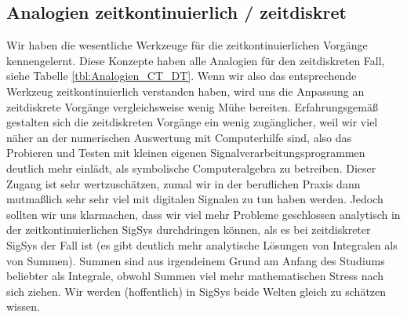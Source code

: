 \subsection*{Analogien zeitkontinuierlich / zeitdiskret}
%
Wir haben die wesentliche Werkzeuge für die zeitkontinuierlichen Vorgänge
kennengelernt.  Diese Konzepte haben alle Analogien für den zeitdiskreten Fall,
siehe Tabelle \ref{tbl:Analogien_CT_DT}.
%
Wenn wir also das entsprechende Werkzeug zeitkontinuierlich verstanden haben,
wird uns die Anpassung an zeitdiskrete Vorgänge vergleichsweise wenig Mühe
bereiten. Erfahrungsgemäß gestalten sich die zeitdiskreten Vorgänge ein wenig
zugänglicher, weil wir viel näher an der numerischen Auswertung mit Computerhilfe
sind, also das Probieren und Testen mit kleinen eigenen Signalverarbeitungsprogrammen
deutlich mehr einlädt, als symbolische Computeralgebra zu betreiben. Dieser
Zugang ist sehr wertzuschätzen, zumal wir in der beruflichen Praxis dann mutmaßlich
sehr sehr viel mit digitalen Signalen zu tun haben werden. Jedoch
sollten wir uns klarmachen, dass wir viel mehr Probleme geschlossen analytisch
in der zeitkontinuierlichen SigSys durchdringen können, als es bei zeitdiskreter
SigSys der Fall ist (es gibt deutlich mehr analytische Lösungen von Integralen als von
Summen). Summen sind aus irgendeinem Grund am Anfang des Studiums beliebter als
Integrale, obwohl Summen viel mehr mathematischen Stress nach sich ziehen.
%
Wir werden (hoffentlich) in SigSys beide Welten gleich zu schätzen wissen.
%
%
